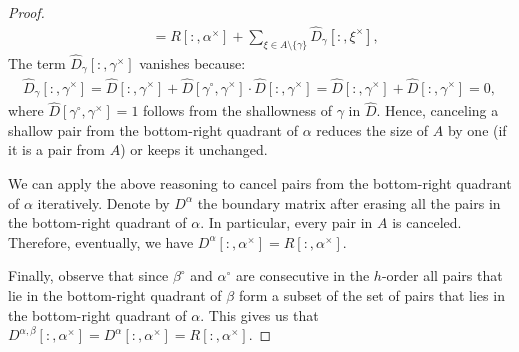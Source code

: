 \documentclass[10pt,a4paper]{amsart}
\newcommand{\bda}{\xi}
\newcommand{\bdb}{\gamma}
\newcommand{\bds}{\alpha}
\newcommand{\bdt}{\beta}
\newcommand{\bth}[1]{#1^\circ}
\newcommand{\dth}[1]{#1^{\!\times}}
\newcommand{\mD}{D}
\newcommand{\mR}{R}
\newcommand{\mf}{h}
\begin{document}
\begin{proof}
\begin{align*}
        &= \mR[:,\dth\bds] +\sum\limits_{\bda \in A\setminus\{\bdb\}} \hat{\mD}_{\bdb}[:,\dth\bda],
\end{align*}
The term $\hat{\mD}_{\bdb}[:,\dth\bdb]$ vanishes because:
\begin{align*}
    \hat{\mD}_{\bdb}[:,\dth\bdb] = \hat{\mD}[:,\dth\bdb] + \hat{\mD}[\bth\bdb,\dth\bdb] \cdot \hat{\mD}[:,\dth\bdb] = \hat{\mD}[:,\dth\bdb] + \hat{\mD}[:,\dth\bdb] = 0,
\end{align*}
where  $\hat{\mD}[\bth\bdb,\dth\bdb]  = 1$ follows from the shallowness of $\bdb$ in $\hat{\mD}$.
Hence, canceling a shallow pair from the bottom-right quadrant of $\bds$ reduces the size of $A$ by one (if it is a pair from $A$) or keeps it unchanged. 

\noindent We can apply the above reasoning to cancel pairs from the bottom-right quadrant of $\bds$ iteratively.
Denote by $\mD^{\bds}$ the boundary matrix after erasing all the pairs in the bottom-right quadrant of $\bds$. 
In particular, every pair in $A$ is canceled. 
Therefore, eventually, we have $\mD^{\bds}[:,\dth\bds] = \mR[:,\dth\bds]$.



\noindent Finally, observe that since $\bth\bdt$ and $\bth\alpha$ are consecutive in the $\mf$-order all pairs that lie in the bottom-right quadrant of $\bdt$ form a subset of the set of pairs that lies in the bottom-right quadrant of $\bds$. 
This gives us that $\mD^{\bds,\bdt}[:,\dth\bds] = \mD^{\bds}[:,\dth\bds] = \mR[:,\dth\bds].$





\end{proof}
\end{document}
